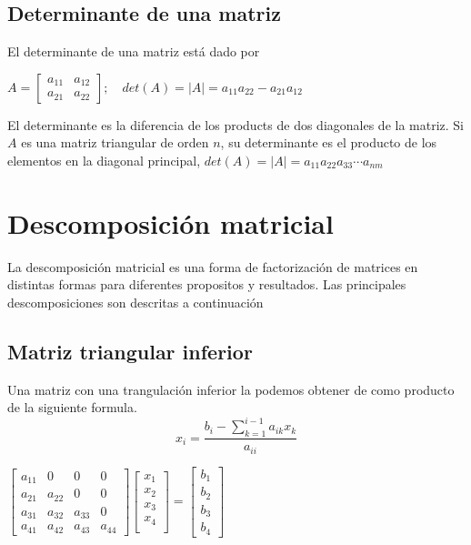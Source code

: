 \subsection{Determinante de una matriz}
El determinante de una matriz est\'a dado por
\begin{center}
$A=\begin{bmatrix}a_{11} & a_{12}\\ a_{21} & a_{22} \end{bmatrix} ; \quad det(A)=|A|=a_{11}a_{22}-a_{21}a_{12}$
\end{center}
El determinante es la diferencia de los products de dos diagonales de la matriz. Si $A$ es una matriz triangular de orden $n$, su determinante es el producto de los elementos en la diagonal principal, $det(A)=|A|=a_{11}a_{22}a_{33}\cdots a_{nm}$
\section{Descomposici\'on matricial}
La descomposici\'on matricial es una forma de factorizaci\'on de matrices en distintas formas para diferentes propositos y resultados. Las principales descomposiciones son descritas a continuaci\'on 
\subsection{Matriz triangular inferior}
Una matriz con una trangulaci\'on inferior la podemos obtener de como producto de la siguiente formula.
\begin{displaymath}
\nonumber x_i=\frac{b_i-\sum_{k=1}^{i-1}a_{ik}x_k}{a_{ii}} 
\end{displaymath}
\begin{center}
$\begin{bmatrix} a_{11} & 0 & 0 & 0 \\
				 a_{21} & a_{22} & 0 & 0 \\
				 a_{31} & a_{32} & a_{33} & 0 \\
				 a_{41} & a_{42} & a_{43} & a_{44}
\end{bmatrix}\begin{bmatrix} x_1 \\
							 x_2 \\
							 x_3 \\
							 x_4 \\
\end{bmatrix} = \begin{bmatrix} b_1 \\
							   b_2 \\
							   b_3 \\
							   b_4 
\end{bmatrix}$
\end{center}
